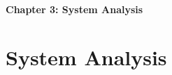 

\cleardoublepage %
\thispagestyle{plain} %

\vspace*{\fill}
\begin{center}
    {\Huge\bfseries Chapter 3: System Analysis \par}
    \vspace{1cm}
\end{center}
\vspace*{\fill}

\clearpage %

\chapter{System Analysis}  %
\label{chap:system_analysis}







